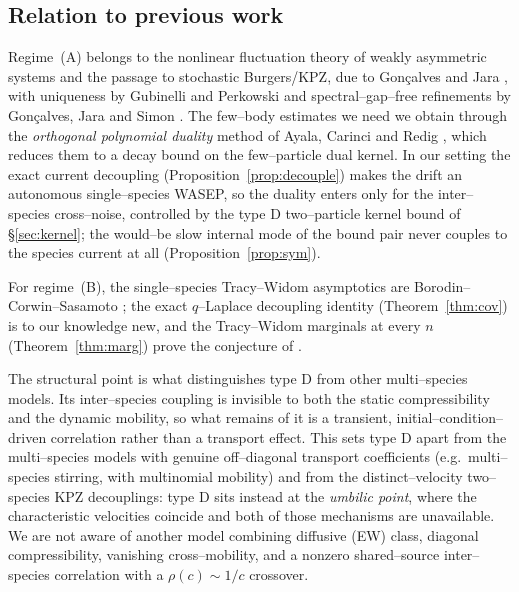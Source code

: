 \documentclass[11pt]{article}
\theoremstyle{plain}
\theoremstyle{definition}
\theoremstyle{remark}
\begin{document}
\subsection{Relation to previous work}\label{sec:introlit}
Regime~(A) belongs to the nonlinear fluctuation theory of weakly asymmetric systems and
the passage to stochastic Burgers/KPZ, due to Gon\c{c}alves and Jara \cite{GJ}, with
uniqueness by Gubinelli and Perkowski and spectral--gap--free refinements by
Gon\c{c}alves, Jara and Simon \cite{GJS}. The few--body estimates we need we obtain
through the \emph{orthogonal polynomial duality} method of Ayala, Carinci and Redig
\cite{ACR,ACR2}, which reduces them to a decay bound on the few--particle dual kernel. In
our setting the exact current decoupling (Proposition~\ref{prop:decouple}) makes the
drift an autonomous single--species WASEP, so the duality enters only for the
inter--species cross--noise, controlled by the type D two--particle kernel bound of
\S\ref{sec:kernel}; the would--be slow internal mode of the bound pair never couples to
the species current at all (Proposition~\ref{prop:sym}).

For regime~(B), the single--species Tracy--Widom asymptotics are
Borodin--Corwin--Sasamoto \cite{BCS}; the exact $q$--Laplace decoupling identity
(Theorem~\ref{thm:cov}) is to our knowledge new, and the Tracy--Widom marginals at
every $n$ (Theorem~\ref{thm:marg}) prove the conjecture of \cite[\S3.1.1]{REU}.

The structural point is what distinguishes type D from other multi--species models. Its
inter--species coupling is invisible to both the static compressibility and the dynamic
mobility, so what remains of it is a transient, initial--condition--driven correlation
rather than a transport effect. This sets type D apart from the multi--species models
with genuine off--diagonal transport coefficients (e.g.\ multi--species stirring, with
multinomial mobility) and from the distinct--velocity two--species KPZ decouplings:
type D sits instead at the \emph{umbilic point}, where the characteristic velocities
coincide and both of those mechanisms are unavailable. We are not aware of another
model combining diffusive (EW) class, diagonal compressibility, vanishing
cross--mobility, and a nonzero shared--source inter--species correlation with a
$\rho(c)\sim1/c$ crossover.
\end{document}
